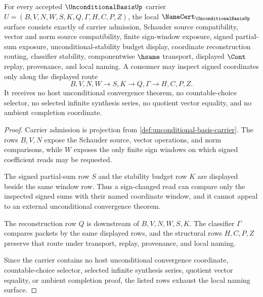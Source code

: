 \begin{theorem}
\label{thm:unconditional-basis-namecert-obligations}
For every accepted $\UnconditionalBasisUp$ carrier $U=(B,V,N,W,S,K,Q,\Gamma,H,C,P,Z)$, the local $\NameCert_{\UnconditionalBasisUp}$ surface consists exactly of carrier admission, Schauder source compatibility, vector and norm source compatibility, finite sign-window exposure, signed partial-sum exposure, unconditional-stability budget display, coordinate reconstruction routing, classifier stability, componentwise $\hsame$ transport, displayed $\Cont$ replay, provenance, and local naming. A consumer may inspect signed coordinates only along the displayed route
$$
B,V,N,W \longrightarrow S,K \longrightarrow Q,\Gamma \longrightarrow H,C,P,Z .
$$
It receives no host unconditional convergence theorem, no countable-choice selector, no selected infinite synthesis series, no quotient vector equality, and no ambient completion coordinate.
\end{theorem}
\begin{proof}
Carrier admission is projection from \autoref{def:unconditional-basis-carrier}. The rows $B,V,N$ expose the Schauder source, vector operations, and norm comparisons, while $W$ exposes the only finite sign windows on which signed coefficient reads may be requested.

The signed partial-sum row $S$ and the stability budget row $K$ are displayed beside the same window row. Thus a sign-changed read can compare only the inspected signed sums with their named coordinate window, and it cannot appeal to an external unconditional convergence theorem.

The reconstruction row $Q$ is downstream of $B,V,N,W,S,K$. The classifier $\Gamma$ compares packets by the same displayed rows, and the structural rows $H,C,P,Z$ preserve that route under transport, replay, provenance, and local naming.

Since the carrier contains no host unconditional convergence coordinate, countable-choice selector, selected infinite synthesis series, quotient vector equality, or ambient completion proof, the listed rows exhaust the local naming surface.
\end{proof}


